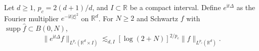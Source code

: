Let $d\geq1$, $p_c=2(d+1)/d$, and $I\subset\mathbb R$ be a compact interval. Define $e^{\mathrm i t\Delta}$ as the Fourier multiplier $e^{-\mathrm i t|\xi|^2}$ on $\mathbb R^d$. For $N\geq2$ and Schwartz $f$ with $\operatorname{supp}\widehat f\subset B(0,N)$,
\[
\|e^{\mathrm i t\Delta}f\|_{L^{p_c}(\mathbb R^d\times I)}
 \lesssim_{d,I}[\log(2+N)]^{2/p_c}\|f\|_{L^{p_c}(\mathbb R^d)}.
\]
